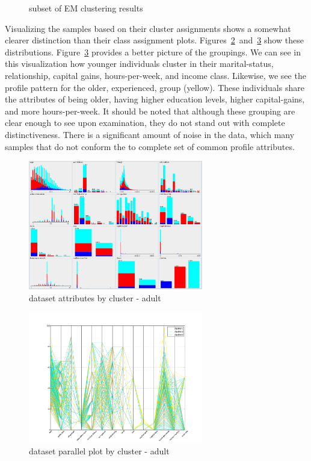 \documentclass{sig-alternate}
\begin{document}
\begin{figure}[!htbp]
    \centering
    \theverbbox
    \caption{subset of EM clustering results\label{em-summary}}
\end{figure}

Visualizing the samples based on their cluster assignments shows a somewhat clearer distinction than their class assignment plots. Figures~\ref{adult-attr-cluster}~and~\ref{adult-parallel-cluster} show these distributions. Figure~\ref{adult-parallel-cluster} provides a better picture of the groupings. We can see in this visualization how younger individuals cluster in their marital-status, relationship, capital gains, hours-per-week, and income class. Likewise, we see the profile pattern for the older, experienced, group (yellow). These individuals share the attributes of being older, having higher education levels, higher capital-gains, and more hours-per-week. It should be noted that although these grouping are clear enough to see upon examination, they do not stand out with complete distinctiveness. There is a significant amount of noise in the data, which many samples that do not conform the to complete set of common profile attributes.

\begin{figure}[!htbp]
    \centering
    \includegraphics[width=3in]{part2/adult/attr-cluster.pdf}
    \caption{dataset attributes by cluster - adult\label{adult-attr-cluster}}
\end{figure} 

\begin{figure}[!htbp]
    \centering
    \includegraphics[width=3in]{part2/adult/parallel-cluster.pdf}
    \caption{dataset parallel plot by cluster - adult\label{adult-parallel-cluster}}
\end{figure} 
\end{document}
